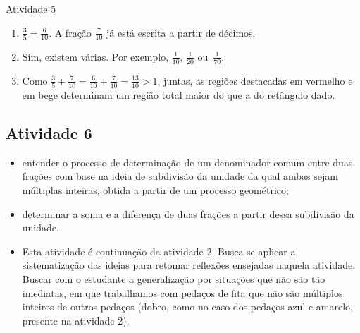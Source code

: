 \begin{multicols}{2}
\begin{resposta*}{Atividade 5}
\begin{enumerate} [\quad a)]
    \item             $\frac{3}{5} = \frac{6}{10}$. A fração       $\frac{7}{10}$       já está escrita a partir de décimos.
    \item       Sim, existem várias. Por exemplo,       $\frac{1}{10}$,       $\frac{1}{20}$       ou~$\frac{1}{70}$. 
    \item       Como       $\frac{3}{5}+\frac{7}{10} = \frac{6}{10} + \frac{7}{10} = \frac{13}{10} > 1$, juntas, as regiões destacadas em vermelho e em bege determinam um região total maior do que a do retângulo dado.
\end{enumerate} %
  
  
\end{resposta*}

\subsection{Atividade 6}

\newline \vspace{.15cm}

\begin{itemize} %
 \item  entender o processo de determinação de um denominador comum entre duas frações com base na ideia de subdivisão da unidade da qual ambas sejam múltiplas inteiras, obtida a partir de um processo geométrico;
  \item      determinar a soma e a diferença de duas frações a partir dessa subdivisão da unidade.
\end{itemize} %


 \vspace{.15cm}

\begin{itemize} %
  \item     Esta atividade é continuação da atividade 2. Busca-se aplicar a sistematização das ideias para retomar reflexões ensejadas naquela atividade. Buscar com o estudante a generalização por situações que não são tão imediatas, em que trabalhamos com pedaços de fita que não são múltiplos inteiros de outros pedaços (dobro, como no caso dos pedaços azul e amarelo, presente na atividade 2).



\end{itemize}
\end{multicols}
